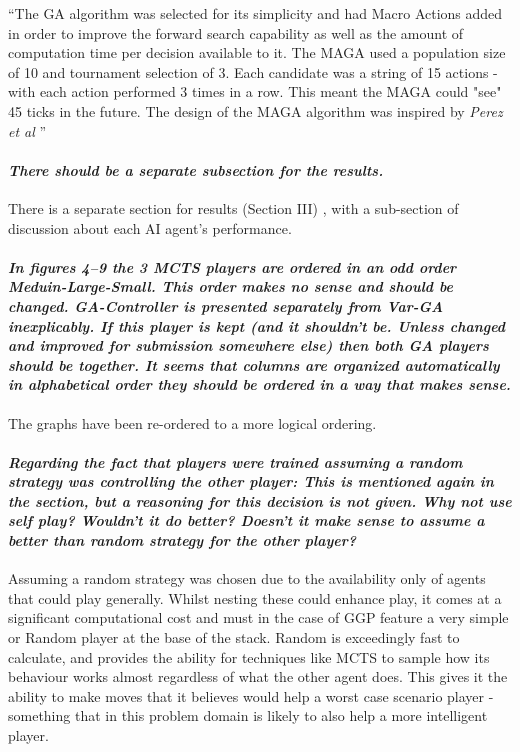 \documentclass{article}
\begin{document}
``The GA algorithm was selected for its simplicity and had Macro Actions added in order to improve the forward search capability as well as the amount of computation time per decision available to it. The MAGA used a population size of 10 and tournament selection of 3. Each candidate was a string of 15 actions - with each action performed 3 times in a row. This meant the MAGA could "see" 45 ticks in the future. The design of the MAGA algorithm was inspired by \textit{Perez et al} \cite{perez2013rolling}''
\paragraph*{\textit{There should be a separate subsection for the results.}}
There is a separate section for results (Section III) , with a sub-section of discussion about each AI agent's performance.
\paragraph*{\textit{In figures 4--9 the 3 MCTS players are ordered in an odd order Meduin-Large-Small. This order makes no sense and should be changed. GA-Controller is presented separately from Var-GA inexplicably. If this player is kept (and it shouldn't be. Unless changed and improved for submission somewhere else) then both GA players should be together. It seems that columns are organized automatically in alphabetical order they should be ordered in a way that makes sense.}}
The graphs have been re-ordered to a more logical ordering.
\paragraph*{\textit{Regarding the fact that players were trained assuming a random strategy was controlling the other player: This is mentioned again in the section, but a reasoning for this decision is not given. Why not use self play? Wouldn't it do better? Doesn't it make sense to assume a better than random strategy for the other player?}}
Assuming a random strategy was chosen due to the availability only of agents that could play generally. Whilst nesting these could enhance play, it comes at a significant computational cost and must in the case of GGP feature a very simple or Random player at the base of the stack. Random is exceedingly fast to calculate, and provides the ability for techniques like MCTS to sample how its behaviour works almost regardless of what the other agent does. This gives it the ability to make moves that it believes would help a worst case scenario player - something that in this problem domain is likely to also help a more intelligent player.
\end{document}
